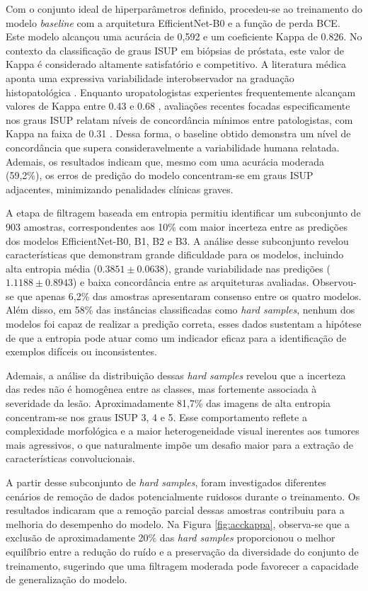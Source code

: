 Com o conjunto ideal de hiperparâmetros definido, procedeu-se ao treinamento do modelo \textit{baseline} com a arquitetura EfficientNet-B0 e a função de perda BCE. Este modelo alcançou uma acurácia de 0,592 e um coeficiente Kappa de 0.826. No contexto da classificação de graus ISUP em biópsias de próstata, este valor de Kappa é considerado altamente satisfatório e competitivo. A literatura médica aponta uma expressiva variabilidade interobservador na graduação histopatológica \cite{Ozkan2016Gleason, cinar2025assessment}. Enquanto uropatologistas experientes frequentemente alcançam valores de Kappa entre 0.43 e 0.68 \cite{Ozkan2016Gleason} , avaliações recentes focadas especificamente nos graus ISUP relatam níveis de concordância mínimos entre patologistas, com Kappa na faixa de 0.31 \cite{cinar2025assessment}. Dessa forma, o baseline obtido demonstra um nível de concordância que supera consideravelmente a variabilidade humana relatada. Ademais, os resultados indicam que, mesmo com uma acurácia moderada (59,2\%), os erros de predição do modelo concentram-se em graus ISUP adjacentes, minimizando penalidades clínicas graves.

A etapa de filtragem baseada em entropia permitiu identificar um subconjunto de 903 amostras, correspondentes aos 10\% com maior incerteza entre as predições dos modelos EfficientNet-B0, B1, B2 e B3. A análise desse subconjunto revelou características que demonstram grande dificuldade para os modelos, incluindo alta entropia média ($0.3851 \pm 0.0638$), grande variabilidade nas predições ($1.1188 \pm 0.8943$) e baixa concordância entre as arquiteturas avaliadas. Observou-se que apenas 6,2\% das amostras apresentaram consenso entre os quatro modelos. Além disso, em 58\% das instâncias classificadas como \textit{hard samples}, nenhum dos modelos foi capaz de realizar a predição correta, esses dados sustentam a hipótese de que a entropia pode atuar como um indicador eficaz para a identificação de exemplos difíceis ou inconsistentes.

Ademais, a análise da distribuição dessas \textit{hard samples} revelou que a incerteza das redes não é homogênea entre as classes, mas fortemente associada à severidade da lesão. Aproximadamente 81,7\% das imagens de alta entropia concentram-se nos graus ISUP 3, 4 e 5. Esse comportamento reflete a complexidade morfológica e a maior heterogeneidade visual inerentes aos tumores mais agressivos, o que naturalmente impõe um desafio maior para a extração de características convolucionais.

A partir desse subconjunto de \textit{hard samples}, foram investigados diferentes cenários de remoção de dados potencialmente ruidosos durante o treinamento. Os resultados indicaram que a remoção parcial dessas amostras contribuiu para a melhoria do desempenho do modelo. Na Figura \ref{fig:acckappa}, observa-se que a exclusão de aproximadamente 20\% das \textit{hard samples} proporcionou o melhor equilíbrio entre a redução do ruído e a preservação da diversidade do conjunto de treinamento, sugerindo que uma filtragem moderada pode favorecer a capacidade de generalização do modelo.


